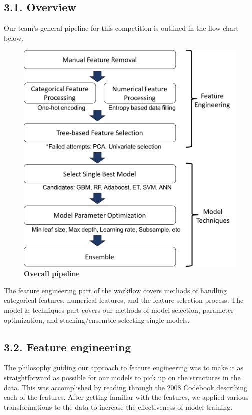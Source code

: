 \subsection*{3.1. Overview}
Our team's general pipeline for this competition is outlined in the flow chart below. \\
\begin{figure}[h]
\center
\includegraphics[scale=0.4]{figure1/figure1.png}
\caption{\textbf{Overall pipeline}}
\end{figure}

The feature engineering part of the workflow covers methods of handling categorical features, numerical features, and the feature selection process. The model \& techniques part covers our methods of model selection, parameter
optimization, and stacking/ensemble selecting single models.

\subsection*{3.2. Feature engineering}
The philosophy guiding our approach to feature engineering was to make it as straightforward as possible for our models to pick up on the structures in the data. This was accomplished by reading through the 2008 Codebook describing each of the features. After getting familiar with the features, we applied various transformations to the data to increase the effectiveness of model training.

